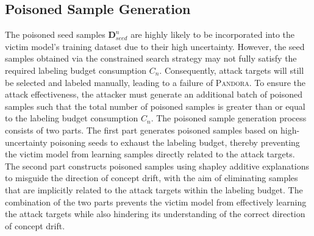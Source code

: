 \documentclass[lettersize,journal]{IEEEtran}
\newcommand{\pandora}{{\scshape Pandora}\xspace}
\begin{document}
\subsection{Poisoned Sample Generation}
\label{Sec: Poisoned Sample Generation}
The poisoned seed samples $\bm{D}_{seed}^{n}$ are highly likely to be incorporated into the victim model’s training dataset due to their high uncertainty.
However, the seed samples obtained via the constrained search strategy may not fully satisfy the required labeling budget consumption $C_{n}$.
Consequently, attack targets will still be selected and labeled manually, leading to a failure of \pandora.
To ensure the attack effectiveness, the attacker must generate an additional batch of poisoned samples such that the total number of poisoned samples is greater than or equal to the labeling budget consumption $C_{n}$.
The poisoned sample generation process consists of two parts.
The first part generates poisoned samples based on high-uncertainty poisoning seeds to exhaust the labeling budget, thereby preventing the victim model from learning samples directly related to the attack targets.
The second part constructs poisoned samples using shapley additive explanations to misguide the direction of concept drift, with the aim of eliminating samples that are implicitly related to the attack targets within the labeling budget.
The combination of the two parts prevents the victim model from effectively learning the attack targets while also hindering its understanding of the correct direction of concept drift.
\end{document}
